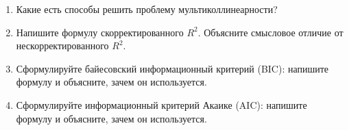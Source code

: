 
\begin{enumerate}[label=\asbuk*), leftmargin=2.2em, itemsep=3pt]
  \item Какие есть способы решить проблему мультиколлинеарности?
  \item Напишите формулу скорректированного $R^2$. Объясните смысловое
        отличие от нескорректированного $R^2$.
  \item Сформулируйте байесовский информационный критерий (BIC): напишите
        формулу и объясните, зачем он используется.
  \item Сформулируйте информационный критерий Акаике (AIC): напишите формулу и
        объясните, зачем он используется.
\end{enumerate}

